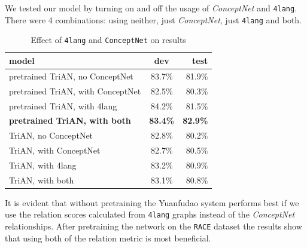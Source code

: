 We tested our model by turning on and off the usage of \textit{ConceptNet} and \texttt{4lang}. There were 4 combinations: using neither, just \textit{ConceptNet}, just \texttt{4lang} and both.

\begin{table}[h!]
	\centering
	\begin{tabular}{ | l | c | r | }
		\hline
		model & dev & test \\ \hline \hline
		pretrained TriAN, no ConceptNet & 83.7\% & 81.9\% \\ \hline
		pretrained TriAN, with ConceptNet & 82.5\% & 80.3\% \\ \hline
		pretrained TriAN, with 4lang & 84.2\% & 81.5\% \\ \hline
		\textbf{pretrained TriAN, with both} & \textbf{83.4\%} & \textbf{82.9\%} \\ \hline
		TriAN, no ConceptNet & 82.8\% & 80.2\% \\ \hline
		TriAN, with ConceptNet & 82.7\% & 80.5\% \\ \hline
		TriAN, with 4lang & 83.2\% & 80.9\% \\ \hline
		TriAN, with both & 83.1\% & 80.8\% \\ \hline
	\end{tabular}
	\caption{Effect of \texttt{4lang} and \texttt{ConceptNet} on results}
	\label{tabl:res}
\end{table}

It is evident that without pretraining the Yuanfudao system performs best if we use the relation scores calculated from \texttt{4lang} graphs instead of the \textit{ConceptNet} relationships.
After pretraining the network on the \texttt{RACE} dataset the results show that using both of the relation metric is most beneficial.